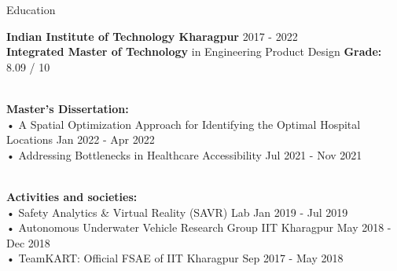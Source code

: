 \documentclass{resume} %
\begin{document}





\begin{rSection}{Education}

{\bf Indian Institute of Technology Kharagpur \hfill} {2017 - 2022}
{\bf \\ Integrated Master of Technology} {in Engineering Product Design \hfill {{\bf Grade:} {8.09 / 10}}}

{\\ \bf Master's Dissertation:} 
{\\• A Spatial Optimization Approach for Identifying the Optimal Hospital Locations \hfill Jan 2022 - Apr 2022
\\• Addressing Bottlenecks in Healthcare
Accessibility \hfill Jul 2021 - Nov 2021}

{\\ \bf Activities and societies:} 
{\\ • Safety Analytics & Virtual Reality (SAVR) Lab \hfill Jan 2019 - Jul 2019}
{\\ • Autonomous Underwater Vehicle Research Group IIT Kharagpur \hfill May 2018 - Dec 2018}
{\\ • TeamKART: Official FSAE of IIT Kharagpur \hfill Sep 2017 - May 2018}


\end{rSection}

\end{document}
